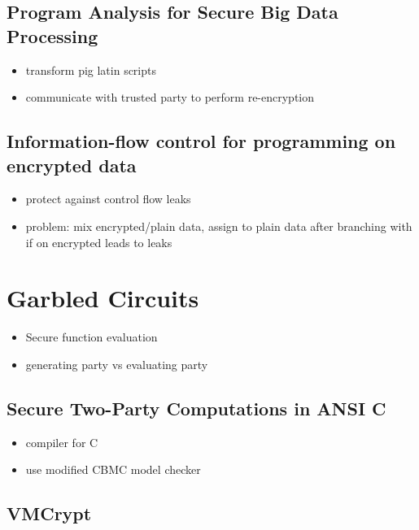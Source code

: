 \subsection{Program Analysis for Secure Big Data Processing}
\label{sec:progr-analys-secure}

\cite{ProgramAnalysisBigData}

\begin{itemize}
\item transform pig latin scripts
\item communicate with trusted party to perform re-encryption
\end{itemize}

\subsection{Information-flow control for programming on encrypted data}
\label{sec:inform-flow-contr}

\cite{InfFlowEnc}
\begin{itemize}
\item protect against control flow leaks
\item problem: mix encrypted/plain data, assign to plain data after
  branching with if on encrypted leads to leaks
\end{itemize}

\section{Garbled Circuits}
\label{sec:garbled-circuits}

\begin{itemize}
\item Secure function evaluation
\item generating party vs evaluating party
\end{itemize}

\subsection{Secure Two-Party Computations in ANSI C}
\label{sec:secure-two-party}

\cite{Secure2PartyC}
\begin{itemize}
\item compiler for C
\item use modified CBMC model checker
\end{itemize}

\subsection{VMCrypt}
\label{sec:vmcrypt}

